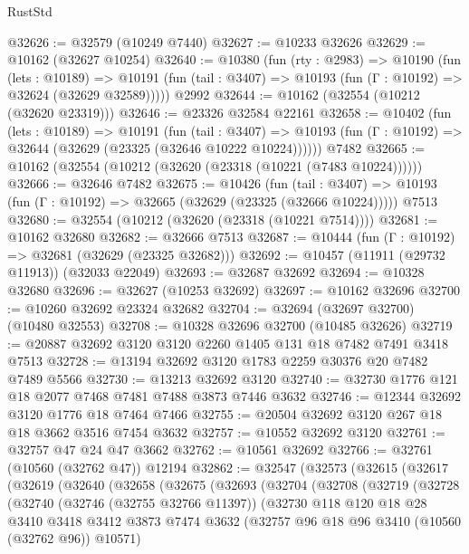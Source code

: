 \begin{lexlean}{RustStd}
\begin{coremodule}
@32626 := @32579 (@10249 @7440)
@32627 := @10233 @32626
@32629 := @10162 (@32627 @10254)
@32640 := @10380
    (fun (rty : @2983) =>
    @10190
      (fun (lets : @10189) =>
      @10191 (fun (tail : @3407) => @10193 (fun (Γ : @10192) => @32624 (@32629 @32589)))))
    @2992
@32644 := @10162 (@32554 (@10212 (@32620 @23319)))
@32646 := @23326 @32584 @22161
@32658 := @10402
    (fun (lets : @10189) =>
    @10191
      (fun (tail : @3407) =>
      @10193 (fun (Γ : @10192) => @32644 (@32629 (@23325 (@32646 @10222 @10224))))))
    @7482
@32665 := @10162 (@32554 (@10212 (@32620 (@23318 (@10221 (@7483 @10224))))))
@32666 := @32646 @7482
@32675 := @10426
    (fun (tail : @3407) => @10193 (fun (Γ : @10192) => @32665 (@32629 (@23325 (@32666 @10224)))))
    @7513
@32680 := @32554 (@10212 (@32620 (@23318 (@10221 @7514))))
@32681 := @10162 @32680
@32682 := @32666 @7513
@32687 := @10444 (fun (Γ : @10192) => @32681 (@32629 (@23325 @32682)))
@32692 := @10457 (@11911 (@29732 @11913)) (@32033 @22049)
@32693 := @32687 @32692
@32694 := @10328 @32680
@32696 := @32627 (@10253 @32692)
@32697 := @10162 @32696
@32700 := @10260 @32692 @23324 @32682
@32704 := @32694 (@32697 @32700) (@10480 @32553)
@32708 := @10328 @32696 @32700 (@10485 @32626)
@32719 := @20887 @32692 @3120 @3120 @2260 @1405 @131 @18 @7482 @7491 @3418 @7513
@32728 := @13194 @32692 @3120 @1783 @2259 @30376 @20 @7482 @7489 @5566
@32730 := @13213 @32692 @3120
@32740 := @32730 @1776 @121 @18 @2077 @7468 @7481 @7488 @3873 @7446 @3632
@32746 := @12344 @32692 @3120 @1776 @18 @7464 @7466
@32755 := @20504 @32692 @3120 @267 @18 @18 @3662 @3516 @7454 @3632
@32757 := @10552 @32692 @3120
@32761 := @32757 @47 @24 @47 @3662
@32762 := @10561 @32692
@32766 := @32761 (@10560 (@32762 @47)) @12194
@32862 := @32547
    (@32573
      (@32615
        (@32617
          (@32619
            (@32640
              (@32658
                (@32675
                  (@32693
                    (@32704
                      (@32708
                        (@32719
                          (@32728
                            (@32740
                              (@32746 (@32755 @32766 @11397))
                              (@32730
                                @118
                                @120
                                @18
                                @28
                                @3410
                                @3418
                                @3412
                                @3873
                                @7474
                                @3632
                                (@32757 @96 @18 @96 @3410 (@10560 (@32762 @96)) @10571)

\end{coremodule}
\end{lexlean}
